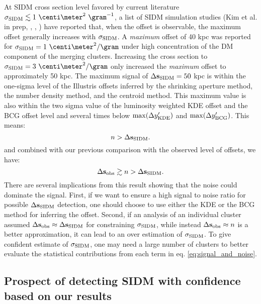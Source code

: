 At SIDM cross section level favored by current literature $\sigmaSIDM
\lesssim 1~\centi\meter^2 ~\gram^{-1}$, a list of SIDM simulation studies (Kim
et al. in prep, \citealt{Robertson2016}, \citealt{Kahlhoefer14}, \citealt{Randall2008d})
have reported that, when the offset is observable, 
the maximum offset generally increases with $\sigma_{\rm SIDM}$. 
A {\it maximum} offset of 40 kpc was reported for $\sigmaSIDM = 1
~\centi\meter^2 / \gram$ under high concentration of the DM component of the 
merging clusters. Increasing the cross section to $\sigmaSIDM = 3
~\centi\meter^2 / \gram$ only increased the {\it maximum} offset to 
approximately 50 kpc.
The maximum signal of $\Delta {\bf s}_{\rm SIDM} = 50$ kpc is within 
the one-sigma level of the Illustris offsets 
inferred by the shrinking aperture method, the number density method, and the
centroid method. This maximum value is also within the two sigma value of the
luminosity weighted KDE offset and the BCG offset level and several times below
$\max(\Delta y_{\rm KDE}')$ and $\max(\Delta y_{\rm BCG}')$. 
This means:
\begin{equation}
	n > \Delta {\bf s}_{\rm SIDM}.
\end{equation}
and combined with our previous comparison with the observed level of offsets,
we have:
\begin{equation}
	\Delta {\bf s}_{\rm obs} \gtrsim n > \Delta {\bf s}_{\rm SIDM}.
\end{equation}
There are several implications from this result showing that the 
noise could dominate the signal. 
First, if we want to ensure a high signal to noise ratio for possible
$\Delta {\bf s}_{\rm SIDM}$ detection, one should choose to use either the KDE or the 
BCG method for inferring the offset.
Second, if an analysis of an individual cluster assumed $\Delta {\bf s}_{\rm obs} \approx \Delta {\bf s}_{\rm SIDM}$ 
for constraining $\sigma_{\rm SIDM}$,
while instead $\Delta {\bf s}_{\rm obs} \approx n$ is a better approximation, it  
can lead to an over estimation of $\sigma_{\rm SIDM}$. 
To give confident estimate of $\sigma_{\rm SIDM}$, one may need 
a large number of clusters to better evaluate 
the statistical contributions from each term in eq. \ref{eq:signal_and_noise}.

\subsection{Prospect of detecting SIDM with confidence based on our results} 
\label{subsec:prospect_of_detecting_SIDM}

